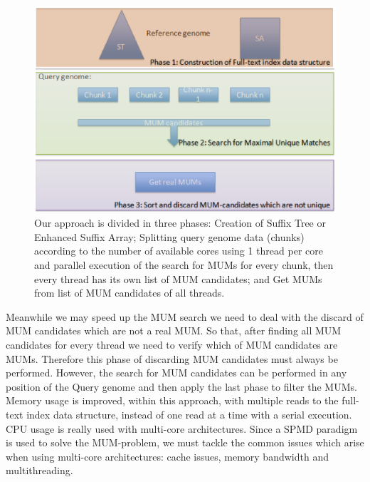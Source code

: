 \documentclass[runningheads,a4paper]{llncs}
\begin{document}
\begin{figure}[h] 
\centering 
\includegraphics{Phases.ps}
\caption{Our approach is divided in three phases: Creation of Suffix Tree or Enhanced Suffix Array; Splitting query genome data (chunks) according to the number of available cores using 1 thread per core and parallel execution of the search for MUMs for every chunk, then every thread has its own list of MUM candidates; and Get MUMs from list of MUM candidates of all threads.}
  \label{phases}
\end{figure}
Meanwhile we may speed up the MUM search we need to deal with the discard of MUM candidates which are not a real MUM. So that, after finding all MUM candidates for every thread we need to verify which of MUM candidates are MUMs. Therefore this phase of discarding MUM candidates must always be performed. However, the search for MUM candidates can be performed in any position of the Query genome and then apply the last phase to filter the MUMs.\\
 Memory usage is improved, within this approach, with multiple reads to the full-text index data structure, instead of one read at a time with a serial execution. CPU usage is really used with multi-core architectures. Since a SPMD paradigm is used to solve the MUM-problem, we must tackle the common issues which arise when using multi-core architectures: cache issues, memory bandwidth and multithreading.\\
\end{document}
